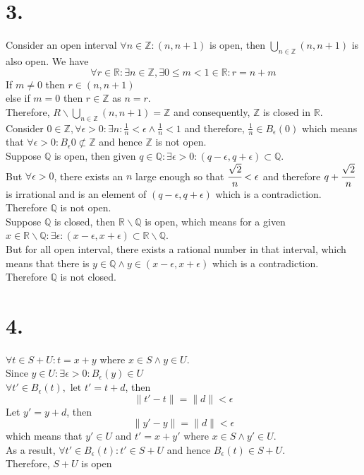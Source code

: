 \documentclass[11pt]{article}
\begin{document}
\section*{3.}
Consider an open interval $\forall n \in \mathbb{Z}: (n,n+1)$ is open, then $\bigcup_{n \in \mathbb{Z}}(n,n+1)$ is also open. We have
\[\forall r \in \mathbb{R}: \exists n \in \mathbb{Z}, \exists 0 \le m < 1 \in \mathbb{R}: r = n+m \]
If $m\ne 0$ then $r \in (n,n+1)$ \\
else if $m=0$ then $r \in \mathbb{Z}$ as $n=r$. \\
Therefore, $R \backslash \bigcup_{n \in \mathbb{Z}}(n,n+1) = \mathbb{Z}$ and consequently, $\mathbb{Z}$ is closed in $\mathbb{R}$. \\
Consider $0 \in \mathbb{Z}, \forall \epsilon >0: \exists n: \frac{1}{n} < \epsilon \land \frac{1}{n} < 1 $ and therefore, $\frac{1}{n} \in B_\epsilon(0)$ which means that $\forall \epsilon >0: B_\epsilon{0} \not\subset \mathbb{Z}$ and hence $\mathbb{Z}$ is not open. \\ 
Suppose $\mathbb{Q}$ is open, then given $q \in \mathbb{Q}: \exists \epsilon >0: (q-\epsilon, q+\epsilon) \subset \mathbb{Q}$. \\
But $\forall \epsilon >0$, there exists an $n$ large enough so that $\cfrac{\sqrt{2}}{n} < \epsilon$ and therefore $q+ \cfrac{\sqrt{2}}{n}$ is irrational and is an element of $(q-\epsilon, q+\epsilon)$ which is a contradiction. Therefore $\mathbb{Q}$ is not open. \\
Suppose $\mathbb{Q}$ is closed, then $\mathbb{R} \backslash \mathbb{Q}$ is open, which means for a given $x \in \mathbb{R} \backslash \mathbb{Q}: \exists \epsilon: (x-\epsilon, x+\epsilon) \subset \mathbb{R} \backslash \mathbb{Q}$.\\
But for all open interval, there exists a rational number in that interval, which means that there is $y \in \mathbb{Q} \land y \in (x-\epsilon, x+\epsilon)$ which is a contradiction. \\
Therefore $\mathbb{Q}$ is not closed.
\pagebreak
\section*{4.}
$\forall t \in S+U: t = x+y$ where $x\in S \land y \in U$. \\
Since $y \in U: \exists \epsilon >0: B_\epsilon(y) \in U$ \\
$\forall t' \in B_\epsilon(t), \text{ let } t' = t+d$, then
\[
\|t' - t\| = \| d \| < \epsilon
\]
Let $y' = y+d$, then
\[
\|y'-y\| = \| d \| < \epsilon
\]
which means that $y' \in U$ and $t' = x + y'$ where $x\in S \land y' \in U$. \\
As a result, $\forall t' \in B_\epsilon(t): t' \in S+U$ and hence $B_\epsilon(t) \in S+U$. \\
Therefore, $S+U$ is open
\pagebreak
\end{document}
